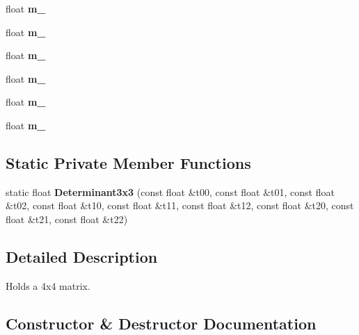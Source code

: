 \begin{DoxyCompactItemize}
float {\bfseries m\+\_}
\item 
\mbox{\label{class_flounder_1_1_matrix4_a7802df5ac864009f393e0309f651e2a8}} 
float {\bfseries m\+\_}
\item 
\mbox{\label{class_flounder_1_1_matrix4_a8b90baaad49b48d78db6ad0a2a130868}} 
float {\bfseries m\+\_}
\item 
\mbox{\label{class_flounder_1_1_matrix4_a8ce1bf746bc2017a8a4c025579fa499c}} 
float {\bfseries m\+\_}
\item 
\mbox{\label{class_flounder_1_1_matrix4_a4483687e6b71ee46e407eb28d7e4a0a5}} 
float {\bfseries m\+\_}
\item 
\mbox{\label{class_flounder_1_1_matrix4_a4d46aecd61190a0716a1e71ba9231531}} 
float {\bfseries m\+\_}
\end{DoxyCompactItemize}
\subsection*{Static Private Member Functions}
\begin{DoxyCompactItemize}
\item 
\mbox{\label{class_flounder_1_1_matrix4_aaaa17a1bbfa162c06fa49b7203896845}} 
static float {\bfseries Determinant3x3} (const float \&t00, const float \&t01, const float \&t02, const float \&t10, const float \&t11, const float \&t12, const float \&t20, const float \&t21, const float \&t22)
\end{DoxyCompactItemize}


\subsection{Detailed Description}
Holds a 4x4 matrix. 



\subsection{Constructor \& Destructor Documentation}
\mbox{\label{class_flounder_1_1_matrix4_a56d1593797ad27dde35926e240c55832}} 
